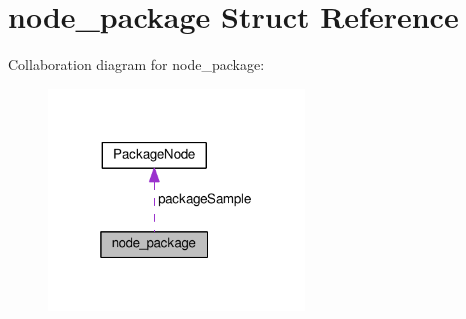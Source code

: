 \hypertarget{structnode__package}{}\section{node\+\_\+package Struct Reference}
\label{structnode__package}


Collaboration diagram for node\+\_\+package\+:\nopagebreak
\begin{figure}[H]
\begin{center}
\leavevmode
\includegraphics[width=193pt]{structnode__package__coll__graph}
\end{center}
\end{figure}
